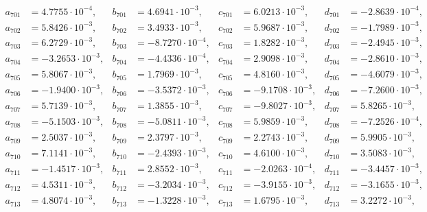 \begin{align*}
  a_{ 701 } &= 4.7755 \cdot 10^{ -4 }, & b_{ 701 } &= 4.6941 \cdot 10^{ -3 }, & c_{ 701 } &= 6.0213 \cdot 10^{ -3 }, & d_{ 701 } &= -2.8639 \cdot 10^{ -4 }, \\ 
  a_{ 702 } &= 5.8426 \cdot 10^{ -3 }, & b_{ 702 } &= 3.4933 \cdot 10^{ -3 }, & c_{ 702 } &= 5.9687 \cdot 10^{ -3 }, & d_{ 702 } &= -1.7989 \cdot 10^{ -3 }, \\ 
  a_{ 703 } &= 6.2729 \cdot 10^{ -3 }, & b_{ 703 } &= -8.7270 \cdot 10^{ -4 }, & c_{ 703 } &= 1.8282 \cdot 10^{ -3 }, & d_{ 703 } &= -2.4945 \cdot 10^{ -3 }, \\ 
  a_{ 704 } &= -3.2653 \cdot 10^{ -3 }, & b_{ 704 } &= -4.4336 \cdot 10^{ -4 }, & c_{ 704 } &= 2.9098 \cdot 10^{ -3 }, & d_{ 704 } &= -2.8610 \cdot 10^{ -3 }, \\ 
  a_{ 705 } &= 5.8067 \cdot 10^{ -3 }, & b_{ 705 } &= 1.7969 \cdot 10^{ -3 }, & c_{ 705 } &= 4.8160 \cdot 10^{ -3 }, & d_{ 705 } &= -4.6079 \cdot 10^{ -3 }, \\ 
  a_{ 706 } &= -1.9400 \cdot 10^{ -3 }, & b_{ 706 } &= -3.5372 \cdot 10^{ -3 }, & c_{ 706 } &= -9.1708 \cdot 10^{ -3 }, & d_{ 706 } &= -7.2600 \cdot 10^{ -3 }, \\ 
  a_{ 707 } &= 5.7139 \cdot 10^{ -3 }, & b_{ 707 } &= 1.3855 \cdot 10^{ -3 }, & c_{ 707 } &= -9.8027 \cdot 10^{ -3 }, & d_{ 707 } &= 5.8265 \cdot 10^{ -3 }, \\ 
  a_{ 708 } &= -5.1503 \cdot 10^{ -3 }, & b_{ 708 } &= -5.0811 \cdot 10^{ -3 }, & c_{ 708 } &= 5.9859 \cdot 10^{ -3 }, & d_{ 708 } &= -7.2526 \cdot 10^{ -4 }, \\ 
  a_{ 709 } &= 2.5037 \cdot 10^{ -3 }, & b_{ 709 } &= 2.3797 \cdot 10^{ -3 }, & c_{ 709 } &= 2.2743 \cdot 10^{ -3 }, & d_{ 709 } &= 5.9905 \cdot 10^{ -3 }, \\ 
  a_{ 710 } &= 7.1141 \cdot 10^{ -3 }, & b_{ 710 } &= -2.4393 \cdot 10^{ -3 }, & c_{ 710 } &= 4.6100 \cdot 10^{ -3 }, & d_{ 710 } &= 3.5083 \cdot 10^{ -3 }, \\ 
  a_{ 711 } &= -1.4517 \cdot 10^{ -3 }, & b_{ 711 } &= 2.8552 \cdot 10^{ -3 }, & c_{ 711 } &= -2.0263 \cdot 10^{ -4 }, & d_{ 711 } &= -3.4457 \cdot 10^{ -3 }, \\ 
  a_{ 712 } &= 4.5311 \cdot 10^{ -3 }, & b_{ 712 } &= -3.2034 \cdot 10^{ -3 }, & c_{ 712 } &= -3.9155 \cdot 10^{ -3 }, & d_{ 712 } &= -3.1655 \cdot 10^{ -3 }, \\ 
  a_{ 713 } &= 4.8074 \cdot 10^{ -3 }, & b_{ 713 } &= -1.3228 \cdot 10^{ -3 }, & c_{ 713 } &= 1.6795 \cdot 10^{ -3 }, & d_{ 713 } &= 3.2272 \cdot 10^{ -3 }, \\ 

\end{align*}
